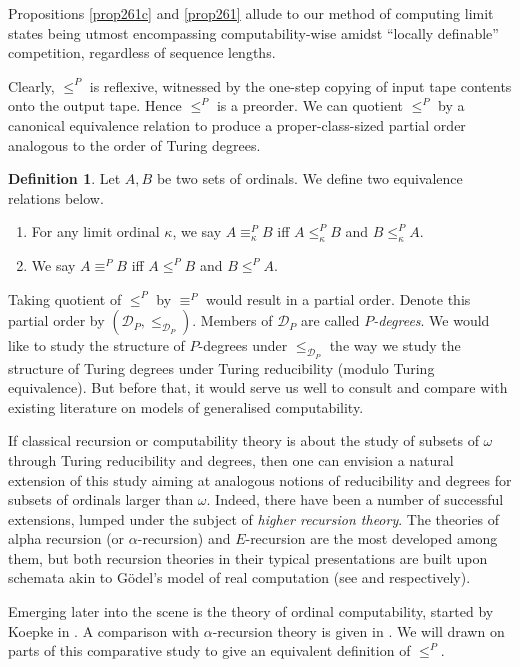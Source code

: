 \documentclass[12pt, twoside]{memoir}
\numberwithin{equation}{section}
\theoremstyle{definition}
\newtheorem{defi}[thm]{Definition}
\theoremstyle{remark}
\theoremstyle{definition}
\theoremstyle{definition}
\theoremstyle{definition}
\theoremstyle{remark}
\begin{document}
Propositions \ref{prop261c} and \ref{prop261} allude to our method of computing limit states being utmost encompassing computability-wise amidst ``locally definable'' competition, regardless of sequence lengths.

Clearly, $\leq^P$ is reflexive, witnessed by the one-step copying of input tape contents onto the output tape. Hence $\leq^P$ is a preorder. We can quotient $\leq^P$ by a canonical equivalence relation to produce a proper-class-sized partial order analogous to the order of Turing degrees.

\begin{defi}
Let $A, B$ be two sets of ordinals. We define two equivalence relations below.
\begin{enumerate}[label=(\arabic*)]
    \item For any limit ordinal $\kappa$, we say $A \equiv^P_{\kappa} B$ iff $A \leq^P_{\kappa} B$ and $B \leq^P_{\kappa} A$.
    \item We say $A \equiv^P B$ iff $A \leq^P B$ and $B \leq^P A$.
\end{enumerate}
\end{defi}

Taking quotient of $\leq^P$ by $\equiv^P$ would result in a partial order. Denote this partial order by $(\mathcal{D}_P, \leq_{\mathcal{D}_P})$. Members of $\mathcal{D}_P$ are called $P$\emph{-degrees}. We would like to study the structure of $P$-degrees under $\leq_{\mathcal{D}_P}$ the way we study the structure of Turing degrees under Turing reducibility (modulo Turing equivalence). But before that, it would serve us well to consult and compare with existing literature on models of generalised computability. 

If classical recursion or computability theory is about the study of subsets of $\omega$ through Turing reducibility and degrees, then one can envision a natural extension of this study aiming at analogous notions of reducibility and degrees for subsets of ordinals larger than $\omega$. Indeed, there have been a number of successful extensions, lumped under the subject of \emph{higher recursion theory}. The theories of alpha recursion (or $\alpha$-recursion) and $E$-recursion are the most developed among them, but both recursion theories in their typical presentations are built upon schemata akin to G\"{o}del's model of real computation (see \cite{takeuti} and \cite{normann} respectively).

Emerging later into the scene is the theory of ordinal computability, started by Koepke in \cite{koepke1}. A comparison with $\alpha$-recursion theory is given in \cite{koepke2}. We will drawn on parts of this comparative study to give an equivalent definition of $\leq^P$.
\end{document}
